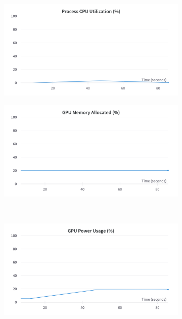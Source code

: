 \begin{figure}[H]
	\centering
	\begin{subfigure}{0.43\textwidth}
		\centering
		\includegraphics[width=\textwidth]{chapters/3_models/imgs/grrun/grruncputiliziation.png}
	\end{subfigure}
	\begin{subfigure}{0.43\textwidth}
		\centering
		\includegraphics[width=\textwidth]{chapters/3_models/imgs/grrun/grrungpumemalloc.png}
	\end{subfigure}\\
	\begin{subfigure}{0.43\textwidth}
		\centering
		\includegraphics[width=\textwidth]{chapters/3_models/imgs/grrun/grrungpupowerusageperc.png}

\end{subfigure}
\end{figure}
